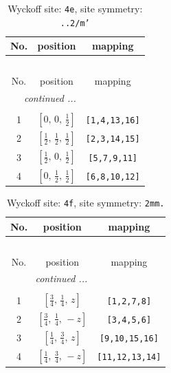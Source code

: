 \documentclass[fleqn,8pt]{jsarticle}
\begin{document}
\begin{longtable}{ccc}
\caption{Wyckoff site: {\tt 4e}, site symmetry: {\tt ..2/m'}}
 \\
 \hline \hline
No. & position & mapping \\ \hline \endfirsthead

\multicolumn{2}{l}{\tablename\ \thetable{}} \\
 \hline \hline
No. & position & mapping \\ \hline \endhead

 \hline \hline
\multicolumn{2}{r}{\footnotesize\it continued ...} \\ \endfoot

 \hline \hline
\multicolumn{2}{r}{} \\ \endlastfoot

1 & $\left[ 0,\, 0,\, \frac{1}{2} \right]$ & {\tt [1,4,13,16]} \\ \hline
2 & $\left[ \frac{1}{2},\, \frac{1}{2},\, \frac{1}{2} \right]$ & {\tt [2,3,14,15]} \\ \hline
3 & $\left[ \frac{1}{2},\, 0,\, \frac{1}{2} \right]$ & {\tt [5,7,9,11]} \\ \hline
4 & $\left[ 0,\, \frac{1}{2},\, \frac{1}{2} \right]$ & {\tt [6,8,10,12]} \\
\end{longtable}
\renewcommand{\arraystretch}{1.2}
\begin{longtable}{ccc}
\caption{Wyckoff site: {\tt 4f}, site symmetry: {\tt 2mm.}}
 \\
 \hline \hline
No. & position & mapping \\ \hline \endfirsthead

\multicolumn{2}{l}{\tablename\ \thetable{}} \\
 \hline \hline
No. & position & mapping \\ \hline \endhead

 \hline \hline
\multicolumn{2}{r}{\footnotesize\it continued ...} \\ \endfoot

 \hline \hline
\multicolumn{2}{r}{} \\ \endlastfoot

1 & $\left[ \frac{3}{4},\, \frac{1}{4},\, z \right]$ & {\tt [1,2,7,8]} \\ \hline
2 & $\left[ \frac{3}{4},\, \frac{1}{4},\, - z \right]$ & {\tt [3,4,5,6]} \\ \hline
3 & $\left[ \frac{1}{4},\, \frac{3}{4},\, z \right]$ & {\tt [9,10,15,16]} \\ \hline
4 & $\left[ \frac{1}{4},\, \frac{3}{4},\, - z \right]$ & {\tt [11,12,13,14]} \\
\end{longtable}
\end{document}

